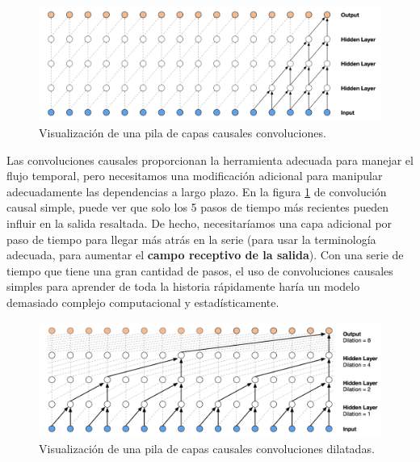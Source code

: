 \documentclass[a4paper,12pt]{article}
\begin{document}
\begin{figure}[H]
	\begin{center}				
	\includegraphics[width=1\textwidth]{stackcausal-conv.png}
  	\caption{Visualización de una pila de capas causales convoluciones.}
  	\label{fig:stackcausal-conv}
  	\end{center}
\end{figure}

Las convoluciones causales proporcionan la herramienta adecuada para manejar el flujo temporal, pero necesitamos una modificación adicional para manipular adecuadamente las dependencias a largo plazo. En la figura \ref{fig:stackcausal-conv} de convolución causal simple, puede ver que solo los 5 pasos de tiempo más recientes pueden influir en la salida resaltada. De hecho, necesitaríamos una capa adicional por paso de tiempo para llegar más atrás en la serie (para usar la terminología adecuada, para aumentar el \textbf{campo receptivo de la salida}). Con una serie de tiempo que tiene una gran cantidad de pasos, el uso de convoluciones causales simples para aprender de toda la historia rápidamente haría un modelo demasiado complejo computacional y estadísticamente.

\begin{figure}[H]
	\begin{center}				
	\includegraphics[width=1\textwidth]{dilated-conv.png}
  	\caption{Visualización de una pila de capas causales convoluciones dilatadas.}
  	\label{fig:dilated-conv}
  	\end{center}
\end{figure}
\end{document}
